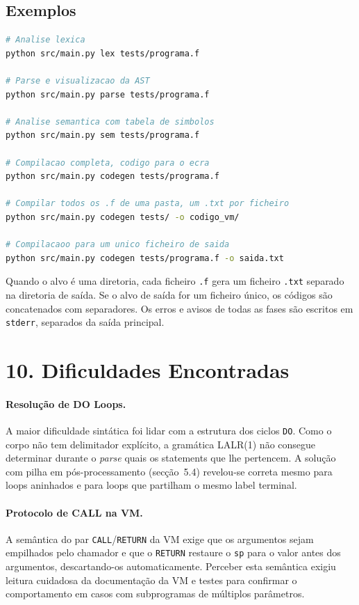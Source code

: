 \documentclass[a4paper]{article}
\begin{document}
\subsection*{Exemplos}

\begin{lstlisting}[language=bash, basicstyle=\ttfamily\small, frame=single]
# Analise lexica
python src/main.py lex tests/programa.f

# Parse e visualizacao da AST
python src/main.py parse tests/programa.f

# Analise semantica com tabela de simbolos
python src/main.py sem tests/programa.f

# Compilacao completa, codigo para o ecra
python src/main.py codegen tests/programa.f

# Compilar todos os .f de uma pasta, um .txt por ficheiro
python src/main.py codegen tests/ -o codigo_vm/

# Compilacaoo para um unico ficheiro de saida
python src/main.py codegen tests/programa.f -o saida.txt
\end{lstlisting}

\noindent Quando o alvo é uma diretoria, cada ficheiro \texttt{.f} gera um ficheiro \texttt{.txt} separado na diretoria de saída. Se o alvo de saída for um ficheiro único, os códigos são concatenados com separadores. Os erros e avisos de todas as fases são escritos em \texttt{stderr}, separados da saída principal.

\section*{10. Dificuldades Encontradas}

\paragraph{Resolução de DO Loops.} A maior dificuldade sintática foi lidar com a estrutura dos ciclos \texttt{DO}. Como o corpo não tem delimitador explícito, a gramática LALR(1) não consegue determinar durante o \textit{parse} quais os statements que lhe pertencem. A solução com pilha em pós-processamento (secção~5.4) revelou-se correta mesmo para loops aninhados e para loops que partilham o mesmo label terminal.

\paragraph{Protocolo de CALL na VM.} A semântica do par \texttt{CALL}/\texttt{RETURN} da VM exige que os argumentos sejam empilhados pelo chamador e que o \texttt{RETURN} restaure o \texttt{sp} para o valor antes dos argumentos, descartando-os automaticamente. Perceber esta semântica exigiu leitura cuidadosa da documentação da VM e testes para confirmar o comportamento em casos com subprogramas de múltiplos parâmetros.
\end{document}
